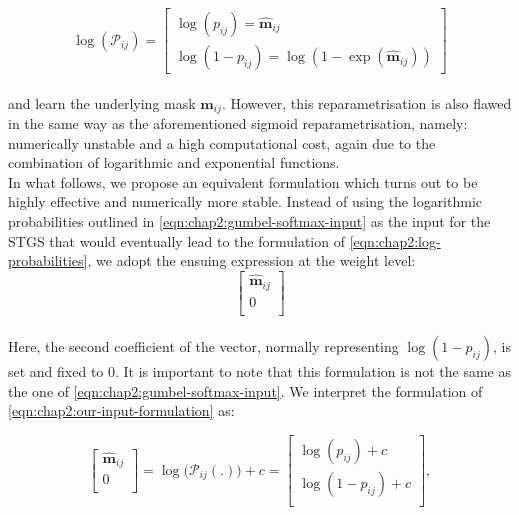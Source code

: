 \begin{equation}
  \label{eqn:chap2:log-probabilities}
  \log(\mathcal{P}_{ij}) =
  \begin{bmatrix}
    \log(p_{ij}) = \bm{\hat{m}}_{ij} \\
    \log(1-p_{ij}) = \log(1-\exp(\bm{\hat{m}}_{ij}))
  \end{bmatrix}
\end{equation}\\

\noindent and learn the underlying mask $\bm{\hat{m}}_{ij}$. However, this
reparametrisation is also flawed in the same way as the aforementioned sigmoid
reparametrisation, namely: numerically unstable and a high computational cost,
again due to the combination of logarithmic and exponential functions.\\

In what follows, we propose an equivalent formulation which turns out to be
highly effective and numerically more stable.  Instead of using the logarithmic
probabilities outlined in \cref{eqn:chap2:gumbel-softmax-input} as the input for
the \ac{STGS} that would eventually lead to the formulation of
\cref{eqn:chap2:log-probabilities}, we adopt the ensuing expression at the
weight level:\\

\begin{equation}
  \label{eqn:chap2:our-input-formulation}
  \begin{bmatrix}
    \bm{\hat{m}}_{ij} \\
    0                 \\
  \end{bmatrix}
\end{equation}\\

Here, the second coefficient of the vector, normally representing
$\log(1-p_{ij})$, is set and fixed to 0. It is important to note that this
formulation is not the same as the one of \cref{eqn:chap2:gumbel-softmax-input}.
We interpret the formulation of \cref{eqn:chap2:our-input-formulation} as:

\begin{equation}
  \label{eqn:chap2:our-formulation}
  \begin{bmatrix}
    \bm{\hat{m}}_{ij} \\
    0                 \\
  \end{bmatrix}
  = \log\big(\mathcal{P}_{ij}(.)\big) + c =
  \begin{bmatrix}
    \log(p_{ij}) + c   \\
    \log(1-p_{ij}) + c \\
  \end{bmatrix},
\end{equation}\\


